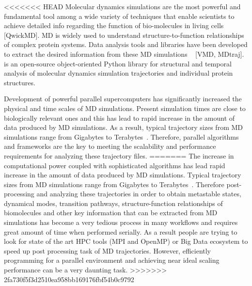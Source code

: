 \label{sec:introduction}
<<<<<<< HEAD
Molecular dynamics simulations are the most powerful and fundamental tool among a wide variety of techniques that enable scientists to achieve detailed info regarding the function of bio-molecules in living cells [QwickMD].
MD is widely used to understand structure-to-function relationships of complex protein systems.
Data analysis tools and libraries have been developed to extract the desired information from these MD simulations ~\cite{Gowers:2016aa,Michaud-Agrawal:2011fu,cpptraj-2013,himach-2008} [VMD, MDtraj].
 \citep{Gowers:2016aa,Michaud-Agrawal:2011fu} is an open-source object-oriented Python library for structural and temporal analysis of molecular dynamics simulation trajectories and individual protein structures. 

Development of powerful parallel supercomputers has significantly increased the physical and time scales of MD simulations.
Present simulation times are close to biologically relevant ones and this has lead to rapid increase in the amount of data produced by MD simulations. 
As a result, typical trajectory sizes from MD simulations range from Gigabytes to Terabytes~\cite{Cheatham:2015}. 
Therefore, parallel algorithms and frameworks are the key to meeting the scalability and performance requirements for analyzing these trajectory files. 
=======
The increase in computational power coupled with sophisticated algorithms has lead rapid increase in the amount of data produced by MD simulations. 
Typical trajectory sizes from MD simulations range from Gigabytes to Terabytes~\cite{Cheatham:2015}. 
Therefore post-processing and analyzing these trajectories in order to obtain metastable states, dynamical modes, transition pathways, structure-function relationships of biomolecules and other key information that can be extracted from MD simulations has become a very tedious process in many workflows and requires great amount of time when performed serially. 
As a result people are trying to look for state of the art HPC tools (MPI and OpenMP) or Big Data ecosystem to speed up post processing task of MD trajectories.
 
However, efficiently programming for a parallel environment and achieving near ideal scaling performance can be a very daunting task. 
>>>>>>> 2fa730f5f3d2510ea958bb169176fbf54b0c9792

